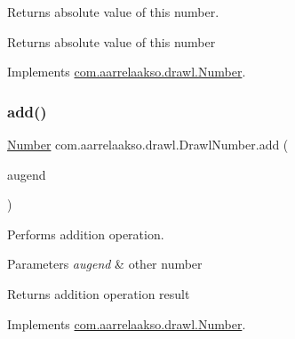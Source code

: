 Returns absolute value of this number. 

\begin{DoxyReturn}{Returns}
absolute value of this number 
\end{DoxyReturn}


Implements \hyperlink{interfacecom_1_1aarrelaakso_1_1drawl_1_1_number_a62af4c1c24c3f9c70dabfe3318e53ac3}{com.\+aarrelaakso.\+drawl.\+Number}.

\mbox{\label{classcom_1_1aarrelaakso_1_1drawl_1_1_drawl_number_a484120b1cacb13f1266bf1d3f002ce3d}} 
\subsubsection{\texorpdfstring{add()}{add()}\hspace{0.1cm}{\footnotesize\ttfamily [1/3]}}
{\footnotesize\ttfamily \hyperlink{interfacecom_1_1aarrelaakso_1_1drawl_1_1_number}{Number} com.\+aarrelaakso.\+drawl.\+Drawl\+Number.\+add (\begin{DoxyParamCaption}\item[{@Not\+Null final \hyperlink{interfacecom_1_1aarrelaakso_1_1drawl_1_1_number}{Number}}]{augend }\end{DoxyParamCaption})}



Performs addition operation. 


\begin{DoxyParams}{Parameters}
{\em augend} & other number \\
\hline
\end{DoxyParams}
\begin{DoxyReturn}{Returns}
addition operation result 
\end{DoxyReturn}


Implements \hyperlink{interfacecom_1_1aarrelaakso_1_1drawl_1_1_number_a05193401712bbba333a586751633c5f6}{com.\+aarrelaakso.\+drawl.\+Number}.

\mbox{\label{classcom_1_1aarrelaakso_1_1drawl_1_1_drawl_number_adf7216ecb118a2bbd1d4aba6a51110bc}} 
